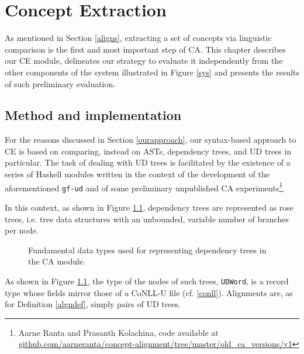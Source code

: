 \chapter{Concept Extraction} \label{ch3} 
As mentioned in Section \ref{aligns}, extracting a set of concepts via linguistic comparison is the first and most important step of CA. This chapter describes our CE module, delineates our strategy to evaluate it independently from the other components of the system illustrated in Figure \ref{sys} and presents the results of such preliminary evaluation.

\section{Method and implementation} \label{ce}
For the reasons discussed in Section \ref{ourapproach}, our syntax-based approach to CE is based on comparing, instead on ASTs, dependency trees, and UD trees in particular.
The task of dealing with UD trees is facilitated by the existence of a series of Haskell modules written in the context of the development of the aforementioned \texttt{gf-ud} and of some preliminary unpublished CA experiments\footnote{Aarne Ranta and Prasanth Kolachina, code available at \url{github.com/aarneranta/concept-alignment/tree/master/old_ca_versions/v1}}. \smallskip

In this context, as shown in Figure \ref{types}, dependency trees are represented as rose trees, i.e. tree data structures with an unbounded, variable number of branches per node.

\begin{figure}[H] 
  \centering
  
  \caption[Fundamental data typesfor dependency trees]{Fundamental data types used for representing dependency trees in the CA module.}
  \label{types}
 \end{figure}

As shown in Figure \ref{types}, the type of the nodes of such trees, \texttt{UDWord}, is a record type whose fields mirror those of a CoNLL-U file (cf. \ref{conll}). Alignments are, as for Definition \ref{algndef}, simply pairs of UD trees.

